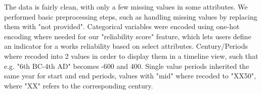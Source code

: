 \documentclass{article}
\begin{document}
The data is fairly clean, with only a few missing values in some attributes. We performed basic preprocessing steps, such as handling missing values by replacing them with "not provided".
Categorical variables were encoded using one-hot encoding where needed for our "reliability score" feature, which lets users define an indicator for a works reliability based on select attributes.
Century/Periods where recoded into 2 values in order to display them in a timeline view, such that e.g. "6th BC-4th AD" becomes -600 and 400. Single value periods inherited the same year for start and end periods, 
values with "mid" where recoded to "XX50", where "XX" refers to the corresponding century.


\end{document}
